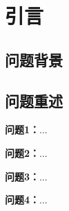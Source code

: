 %
\section{引言}
\subsection{问题背景}



\subsection{问题重述}

\textbf{问题1：}...

\textbf{问题2：}...

\textbf{问题3：}...

\textbf{问题4：}...
